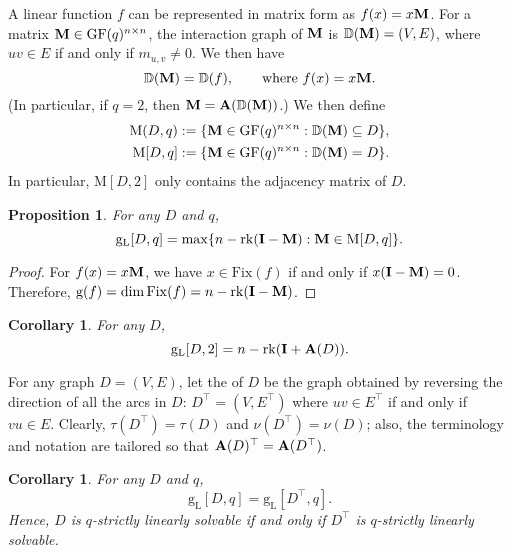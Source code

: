 \documentclass[a4paper, 11pt]{book}
\numberwithin{equation}{section}
\theoremstyle{plain}
\newtheorem{corollary}	[equation]	{Corollary}
\newtheorem{proposition}[equation]	{Proposition}
\newcommand{\feedback}{\tau}
\newcommand{\packing}{\nu}
\newcommand{\adjacency}{{\bf A}}
\newcommand{\linear}[1]{#1_\mathrm{L}}
\newcommand{\IG}{\mathbb{D}}
\newcommand{\matrices}{\mathrm{M}}
\newcommand{\Fix}{\mathrm{Fix}}
\newcommand{\guessing}{\mathrm{g}}
\newcommand{\linearGuessing}{\linear{\guessing}}
\newcommand{\GF}{\mathrm{GF}}
\newcommand{\rank}{\mathrm{rk}}
\renewcommand{\(}{\ldbrack}
\renewcommand{\)}{\rdbrack}
\newcommand{\BF}[1]{{\bf\boldmath{#1}\unboldmath}}
\begin{document}
A linear function $f$ can be represented in matrix form as $f(x) = x {\bf M}$. For a matrix ${\bf M} \in \GF(q)^{n \times n}$, the interaction graph of ${\bf M}$ is $\IG({\bf M}) = (V, E)$, where $uv \in E$ if and only if $m_{u,v} \ne 0$.  We then have 
\[
	\IG({\bf M}) = \IG(f), \qquad \text{where } f(x) = x {\bf M}.
\]
(In particular, if $q = 2$, then ${\bf M} = \adjacency(\IG({\bf M}))$.) We then define 
\begin{align*}
	\matrices(D,q) &:= \{ {\bf M} \in \GF(q)^{n \times n} : \IG({\bf M}) \subseteq D \},\\
	\matrices[D,q] &:= \{ {\bf M} \in \GF(q)^{n \times n} : \IG({\bf M}) = D \}.
\end{align*}
In particular, $\matrices[D, 2]$ only contains the adjacency matrix of $D$.




\begin{proposition} \label{prop:linear_guessing_rank}
For any $D$ and $q$,
\[
	\linearGuessing[D,q] = \max \{ n - \rank({\bf I} - {\bf M}) : {\bf M} \in \matrices[D, q] \}.
\]
\end{proposition}

\begin{proof}
For $f(x) = x {\bf M}$, we have $x \in \Fix(f)$ if and only if $x ({\bf I} - {\bf M}) = 0$. Therefore, $\guessing(f) = \dim \Fix(f) = n - \rank({\bf I} - {\bf M})$.
\end{proof}


\begin{corollary} \label{cor:linear_guessing_2}
For any $D$,
\[
	\linearGuessing[D, 2] = n - \rank({\bf I} + \adjacency(D)).
\]
\end{corollary}




For any graph $D = (V, E)$, let the \BF{transpose} of $D$ be the graph obtained by reversing the direction of all the arcs in $D$: $D^\top = (V, E^\top)$ where $uv \in E^\top$ if and only if $vu \in E$. Clearly, $\feedback(D^\top) = \feedback(D)$ and $\packing(D^\top) = \packing(D)$; also, the terminology and notation are tailored so that
$\adjacency(D)^\top = \adjacency(D^\top)$.

\begin{corollary} \label{cor:linear_guessing_transpose}
For any $D$ and $q$,
\[
	\linearGuessing[D, q] = \linearGuessing[D^\top, q].
\]
Hence, $D$ is $q$-strictly linearly solvable if and only if $D^\top$ is $q$-strictly linearly solvable.
\end{corollary}
\end{document}
